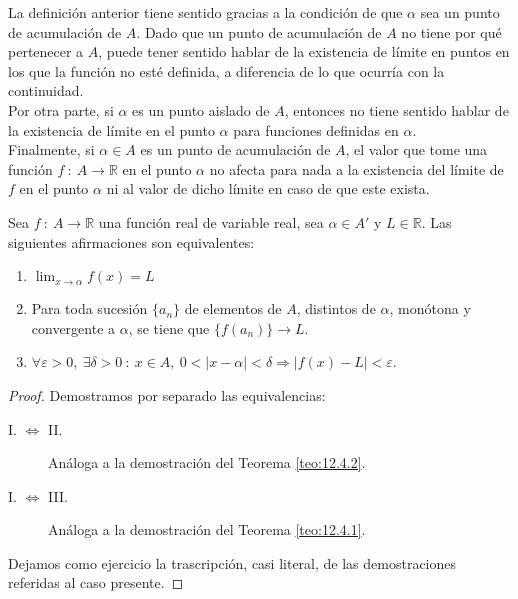 La definición anterior tiene sentido gracias a la condición de que $\alpha$ sea un punto de acumulación de $A$.
Dado que un punto de acumulación de $A$ no tiene por qué pertenecer a $A$, puede tener sentido hablar de la existencia de límite en puntos en los que la función no esté definida, a diferencia de lo que ocurría con la continuidad.\\

Por otra parte, si $\alpha$ es un punto aislado de $A$, entonces no tiene sentido hablar de la existencia de límite en el punto $\alpha$ para funciones definidas en $\alpha$.\\

Finalmente, si $\alpha \in A$ es un punto de acumulación de $A$, el valor que tome una función $f ~:~ A \longrightarrow \mathbb{R}$ en el punto $\alpha$ no afecta para nada a la existencia del límite de $f$ en el punto $\alpha$ ni al valor de dicho límite en
caso de que este exista.

\begin{teo}\label{teo:13.1.4}
    Sea $f ~:~ A \longrightarrow \mathbb{R}$ una función real de variable real, sea $\alpha \in A'$ y $L \in \mathbb{R}$.
    Las siguientes afirmaciones son equivalentes:
    \begin{enumerate}
        \item $\displaystyle\lim_{x \to \alpha} f(x) = L$

        \item Para toda sucesión $\{a_n\}$ de elementos de $A$, distintos de $\alpha$, monótona y convergente a
        $\alpha$, se tiene que $\{f(a_n)\}\longrightarrow L$.

        \item $\forall \varepsilon > 0, ~ \exists \delta > 0 ~:~ x \in A, ~ 0 < |x-\alpha| < \delta \Longrightarrow |f(x)-L| < \varepsilon$.
    \end{enumerate}
\end{teo}
\begin{proof} Demostramos por separado las equivalencias:
    \begin{description}
        \item[I. $\Longleftrightarrow$ II.] Análoga a la demostración del Teorema \ref{teo:12.4.2}.

        \item[I. $\Longleftrightarrow$ III.] Análoga a la demostración del Teorema \ref{teo:12.4.1}.
    \end{description}

    Dejamos como ejercicio la trascripción, casi literal, de las demostraciones referidas al caso presente.
\end{proof}

